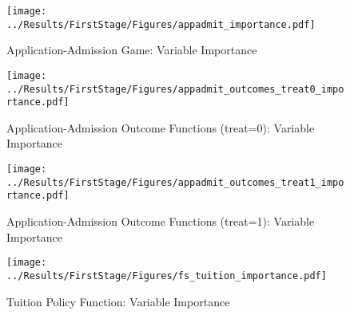 \documentclass[12pt]{article}
\theoremstyle{definition}
\begin{document}





\clearpage






\clearpage



\clearpage
\newpage

\begin{figure}[htbp]
  \begin{center}
    \texttt{[image: ../Results/FirstStage/Figures/appadmit\_importance.pdf]}
    \caption{Application-Admission Game: Variable Importance}
    \label{fig:app_admit_importance}
  \end{center}  
\end{figure}

\begin{figure}[htbp]
  \begin{center}
    \texttt{[image: ../Results/FirstStage/Figures/appadmit\_outcomes\_treat0\_importance.pdf]}
    \caption{
      Application-Admission Outcome Functions (treat=0): Variable Importance
    }
    \label{fig:app_admit_outcome_0_importance}
  \end{center}  
\end{figure}

\begin{figure}[htbp]
  \begin{center}
    \texttt{[image: ../Results/FirstStage/Figures/appadmit\_outcomes\_treat1\_importance.pdf]}
    \caption{
      Application-Admission Outcome Functions (treat=1): Variable Importance
    }
    \label{fig:app_admit_outcome_1_importance}
  \end{center}  
\end{figure}

\begin{figure}[htbp]
  \begin{center}
    \texttt{[image: ../Results/FirstStage/Figures/fs\_tuition\_importance.pdf]}
    \caption{Tuition Policy Function: Variable Importance}
    \label{fig:tuition_importance}
  \end{center}  
\end{figure}
\end{document}
